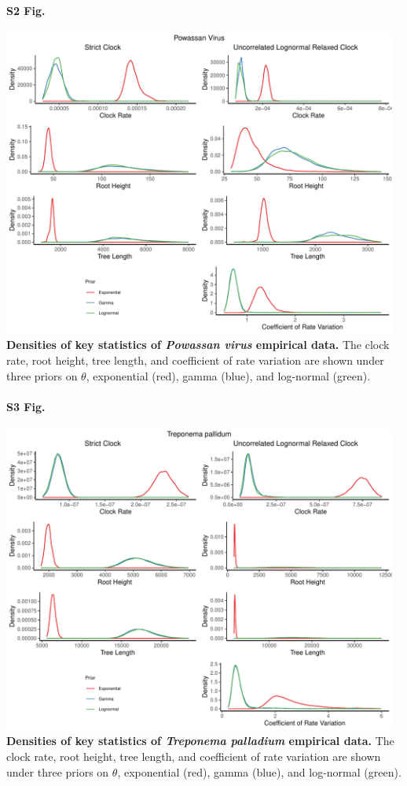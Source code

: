 \documentclass[10pt,letterpaper]{article}
\begin{document}
\paragraph*{S2 Fig.}
\label{S2_Fig}
	\begin{center}
		\includegraphics[width=13cm]{sandbox_figures/powv_density_plot.pdf}\newline
		\textbf{Densities of key statistics of \textit{Powassan virus} empirical data.} The clock rate, root height, tree length, and coefficient of rate variation are shown under three priors on $\theta$, exponential (red), gamma (blue), and log-normal (green).
	\end{center}
\paragraph*{S3 Fig.}
\label{S3_Fig}
	\begin{center}
		\includegraphics[width=13cm]{sandbox_figures/treponema_density_plot.pdf}\newline
		\textbf{Densities of key statistics of \textit{Treponema palladium} empirical data.} The clock rate, root height, tree length, and coefficient of rate variation are shown under three priors on $\theta$, exponential (red), gamma (blue), and log-normal (green).
	\end{center}
\end{document}

